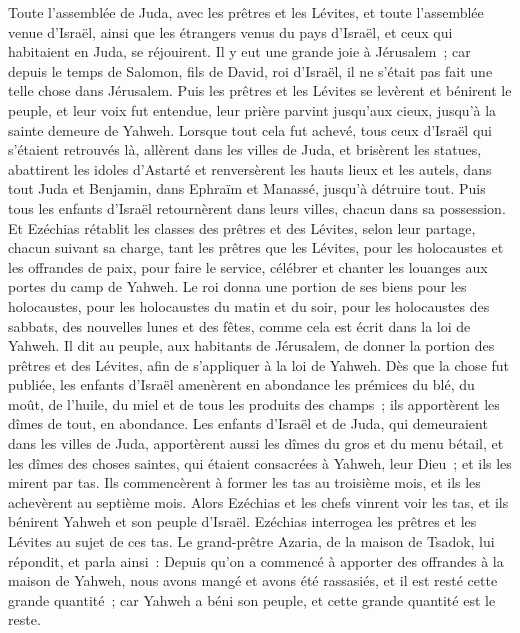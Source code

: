 \begin{multicols}{2}
Toute l'assemblée de Juda, avec les prêtres et les Lévites, et toute l'assemblée venue d'Israël, ainsi que les étrangers venus du pays d'Israël, et ceux qui habitaient en Juda, se réjouirent.
Il y eut une grande joie à Jérusalem~; car depuis le temps de Salomon, fils de David, roi d'Israël, il ne s'était pas fait une telle chose dans Jérusalem.
Puis les prêtres et les Lévites se levèrent et bénirent le peuple, et leur voix fut entendue, leur prière parvint jusqu'aux cieux, jusqu'à la sainte demeure de Yahweh.
\VerseOne{}Lorsque tout cela fut achevé, tous ceux d'Israël qui s'étaient retrouvés là, allèrent dans les villes de Juda, et brisèrent les statues, abattirent les idoles d'Astarté et renversèrent les hauts lieux et les autels, dans tout Juda et Benjamin, dans Ephraïm et Manassé, jusqu'à détruire tout. Puis tous les enfants d'Israël retournèrent dans leurs villes, chacun dans sa possession.
Et Ezéchias rétablit les classes des prêtres et des Lévites, selon leur partage, chacun suivant sa charge, tant les prêtres que les Lévites, pour les holocaustes et les offrandes de paix, pour faire le service, célébrer et chanter les louanges aux portes du camp de Yahweh.
Le roi donna une portion de ses biens pour les holocaustes, pour les holocaustes du matin et du soir, pour les holocaustes des sabbats, des nouvelles lunes et des fêtes, comme cela est écrit dans la loi de Yahweh.
Il dit au peuple, aux habitants de Jérusalem, de donner la portion des prêtres et des Lévites, afin de s'appliquer à la loi de Yahweh.
Dès que la chose fut publiée, les enfants d'Israël amenèrent en abondance les prémices du blé, du moût, de l'huile, du miel et de tous les produits des champs~; ils apportèrent les dîmes de tout, en abondance.
Les enfants d'Israël et de Juda, qui demeuraient dans les villes de Juda, apportèrent aussi les dîmes du gros et du menu bétail, et les dîmes des choses saintes, qui étaient consacrées à Yahweh, leur Dieu~; et ils les mirent par tas.
Ils commencèrent à former les tas au troisième mois, et ils les achevèrent au septième mois.
Alors Ezéchias et les chefs vinrent voir les tas, et ils bénirent Yahweh et son peuple d'Israël.
Ezéchias interrogea les prêtres et les Lévites au sujet de ces tas.
Le grand-prêtre Azaria, de la maison de Tsadok, lui répondit, et parla ainsi~: Depuis qu'on a commencé à apporter des offrandes à la maison de Yahweh, nous avons mangé et avons été rassasiés, et il est resté cette grande quantité~; car Yahweh a béni son peuple, et cette grande quantité est le reste.

\end{multicols}

